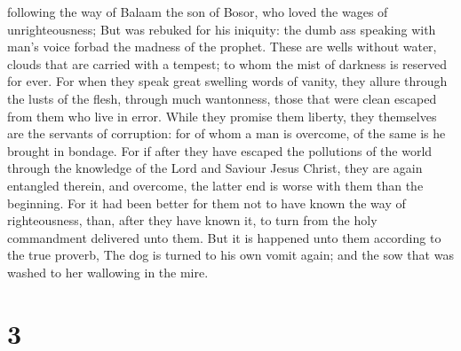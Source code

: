 following the way of Balaam the son of Bosor, who loved the wages of
unrighteousness;  But was rebuked for his iniquity: the
dumb ass speaking with man's voice forbad the madness of the prophet.
 These are wells without water, clouds that are carried
with a tempest; to whom the mist of darkness is reserved for ever.
 For when they speak great swelling words of vanity, they
allure through the lusts of the flesh, through much wantonness, those
that were clean escaped from them who live in error.  While
they promise them liberty, they themselves are the servants of
corruption: for of whom a man is overcome, of the same is he brought in
bondage.  For if after they have escaped the pollutions of
the world through the knowledge of the Lord and Saviour Jesus Christ,
they are again entangled therein, and overcome, the latter end is worse
with them than the beginning.  For it had been better for
them not to have known the way of righteousness, than, after they have
known it, to turn from the holy commandment delivered unto them.
 But it is happened unto them according to the true
proverb, The dog is turned to his own vomit again; and the sow that was
washed to her wallowing in the mire.

\hypertarget{section-2}{%
\section{3}\label{section-2}}

